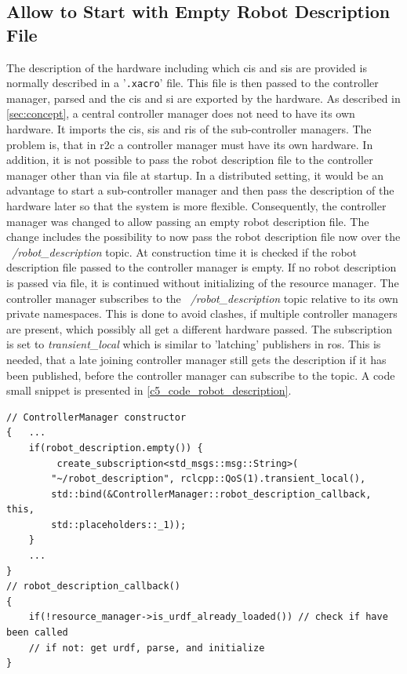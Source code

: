 \subsection{Allow to Start with Empty Robot Description File}
The description of the hardware including which \glspl{ci} and \glspl{si} are provided is normally described in a '\texttt{.xacro}' file. This file is then passed to the controller manager, parsed and the \glspl{ci} and \gls{si} are exported by the hardware. 
As described in \autoref{sec:concept}, a central controller manager does not need to have its own hardware. It imports the \glspl{ci}, \glspl{si} and \glspl{ri} of the sub-controller managers. The problem is, that in \gls{r2c} a controller manager must have its own hardware. In addition, it is not possible to pass the robot description file to the controller manager other than via file at startup. In a distributed setting, it would be an advantage to start a sub-controller manager and then pass the description of the hardware later so that the system is more flexible. \newline
Consequently, the controller manager was changed to allow passing an empty robot description file. The change includes the possibility to now pass the robot description file now over the \textit{~/robot\_description} topic. At construction time it is checked if the robot description file passed to the controller manager is empty. If no robot description is passed via file, it is continued without initializing of the resource manager. The controller manager subscribes to the \textit{~/robot\_description} topic relative to its own private namespaces. This is done to avoid clashes, if multiple controller managers are present, which possibly all get a different hardware passed. The subscription is set to \textit{transient\_local} which is similar to 'latching' publishers in \gls{ros}. This is needed, that a late joining controller manager still gets the description if it has been published, before the controller manager can subscribe to the topic. A code small snippet is presented in \autoref{c5_code_robot_description}.
\lstset{language=C++,basicstyle=\scriptsize}
\begin{lstlisting}[caption=Small code snippet for usage of the robot\_description topic.,label=c5_code_robot_description]
// ControllerManager constructor
{   ...
    if(robot_description.empty()) {
         create_subscription<std_msgs::msg::String>(
        "~/robot_description", rclcpp::QoS(1).transient_local(),
        std::bind(&ControllerManager::robot_description_callback, this,
        std::placeholders::_1));
    } 
    ...
}
// robot_description_callback()
{
    if(!resource_manager->is_urdf_already_loaded()) // check if have been called
    // if not: get urdf, parse, and initialize
}
\end{lstlisting}

